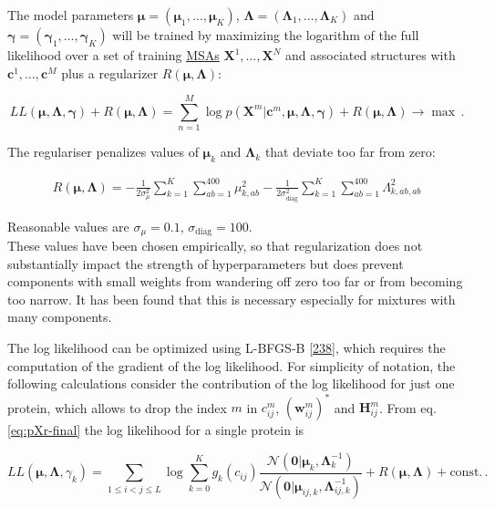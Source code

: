 \documentclass[11pt,a4paper,twoside]{book}
\newcommand{\Gauss}{\mathcal{N}}
\renewcommand{\H}{\mathbf{H}}
\newcommand{\Hij}{\H_{ij}}
\newcommand{\Lijk}{\mathbf{\Lambda}_{ij,k}}
\newcommand{\Lk}{\mathbf{\Lambda}_k}
\newcommand{\muijk}{\mathbf{\mu}_{ij,k}}
\newcommand{\muk}{\mathbf{\mu}_k}
\renewcommand{\c}{\mathbf{c}}
\newcommand{\cij}{c_{ij}}
\newcommand{\wij}{\mathbf{w}_{ij}}
\newcommand{\X}{\mathbf{X}}
\theoremstyle{definition}
\theoremstyle{definition}
\theoremstyle{remark}
\begin{document}
The model parameters
\(\mathbf{\mu} = (\mathbf{\mu}_{1},\ldots,\mathbf{\mu}_K)\),
\(\mathbf{\Lambda} = (\mathbf{\Lambda}_1,\ldots,\mathbf{\Lambda}_K)\)
and \(\mathbf{\gamma} = (\mathbf{\gamma}_1,\ldots,\mathbf{\gamma}_K)\)
will be trained by maximizing the logarithm of the full likelihood over
a set of training \protect\hyperlink{abbrev}{MSAs} \(\X^1,\ldots,\X^N\)
and associated structures with \(\c^1,\ldots,\c^M\) plus a regularizer
\(R(\mathbf{\mu}, \mathbf{\Lambda})\):

\begin{equation}
    L\!L(\mathbf{\mu}, \mathbf{\Lambda}, \mathbf{\gamma}) + R(\mathbf{\mu}, \mathbf{\Lambda}) = \sum_{n=1}^M  \log p(\X^m | \c^m, \mathbf{\mu}, \mathbf{\Lambda}, \mathbf{\gamma} ) + R(\mathbf{\mu}, \mathbf{\Lambda})  \rightarrow \max \, .
\end{equation}

The regulariser penalizes values of \(\muk\) and \(\Lk\) that deviate
too far from zero:

\begin{align}
    R(\mathbf{\mu}, \mathbf{\Lambda}) = -\frac{1}{2 \sigma_{\mu}^2} \sum_{k=1}^K \sum_{ab=1}^{400} \mu_{k,ab}^2 
                        -\frac{1}{2 \sigma_\text{diag}^2} \sum_{k=1}^K \sum_{ab=1}^{400} \Lambda_{k,ab,ab}^2
\label{eq:reg}
\end{align}

Reasonable values are \(\sigma_{\mu}=0.1\),
\(\sigma_\text{diag} = 100\).\\
These values have been chosen empirically, so that regularization does
not substantially impact the strength of hyperparameters but does
prevent components with small weights from wandering off zero too far or
from becoming too narrow. It has been found that this is necessary
especially for mixtures with many components.

The log likelihood can be optimized using L-BFGS-B
{[}\protect\hyperlink{ref-Byrd1995}{238}{]}, which requires the
computation of the gradient of the log likelihood. For simplicity of
notation, the following calculations consider the contribution of the
log likelihood for just one protein, which allows to drop the index
\(m\) in \(\cij^m\), \((\wij^m)^*\) and \(\Hij^m\). From eq.
\eqref{eq:pXr-final} the log likelihood for a single protein is

\begin{equation}
    L\!L(\mathbf{\mu}, \mathbf{\Lambda}, \gamma_k) =  \sum_{1 \le i < j \le L}  \log \sum_{k=0}^K g_{k}(\cij) \frac{\Gauss( \mathbf{0} | \muk, \Lk^{-1})}{\Gauss(\mathbf{0} | \muijk, \Lijk^{-1})}  + R(\mathbf{\mu}, \mathbf{\Lambda}) + \text{const.}\,.
\label{eq:ll-coupling-prior}
\end{equation}
\end{document}
